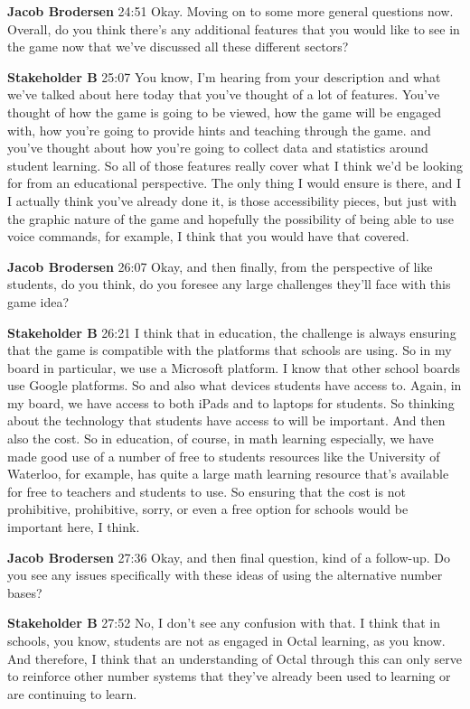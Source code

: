 \documentclass{article}
\begin{document}
\noindent \textbf{Jacob Brodersen}   24:51
Okay.
Moving on to some more general questions now. Overall, do you think there's any additional features that you would like to see in the game now that we've discussed all these different sectors?

\noindent \textbf{Stakeholder B}   25:07
You know, I'm hearing from your description and what we've talked about here today that you've thought of a lot of features. You've thought of how the game is going to be viewed, how the game will be engaged with, how you're going to provide hints and teaching through the game.
and you've thought about how you're going to collect data and statistics around student learning. So all of those features really cover what I think we'd be looking for from an educational perspective. The only thing I would ensure is there, and I
I actually think you've already done it, is those accessibility pieces, but just with the graphic nature of the game and hopefully the possibility of being able to use voice commands, for example, I think that you would have that covered.

\noindent \textbf{Jacob Brodersen}   26:07
Okay, and then finally, from the perspective of like students, do you think, do you foresee any large challenges they'll face with this game idea?

\noindent \textbf{Stakeholder B}   26:21
I think that in education, the challenge is always ensuring that the game is compatible with the platforms that schools are using. So in my board in particular, we use a Microsoft platform. I know that other school boards use Google platforms. So and also what devices students have access to. Again, in my board,
we have access to both iPads and to laptops for students. So thinking about the technology that students have access to will be important. And then also the cost. So in education, of course, in math learning especially, we have made
good use of a number of free to students resources like the University of Waterloo, for example, has quite a large math learning resource that's available for free to teachers and students to use.
So ensuring that the cost is not prohibitive, prohibitive, sorry, or even a free option for schools would be important here, I think.

\noindent \textbf{Jacob Brodersen}   27:36
Okay, and then final question, kind of a follow-up. Do you see any issues specifically with these ideas of using the alternative number bases?

\noindent \textbf{Stakeholder B}   27:52
No, I don't see any confusion with that. I think that in schools, you know, students are not as engaged in Octal learning, as you know. And therefore, I think that an understanding of Octal through this
can only serve to reinforce other number systems that they've already been used to learning or are continuing to learn.
\end{document}
